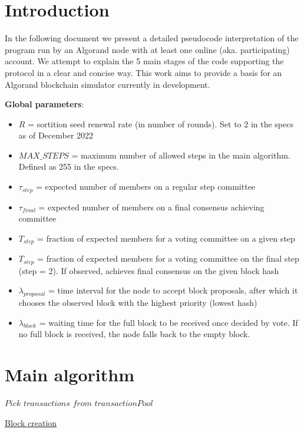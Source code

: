 \documentclass[10pt,a4paper]{article}
\begin{document}
\section{Introduction}
In the following document we present a detailed pseudocode interpretation 
of the program run by an Algorand node with at least one online (aka. 
participating)
account. We attempt to explain the 5 main stages of the code supporting 
the protocol in a clear and concise way.
This work aims to provide a basis for an Algorand blockchain simulator 
currently in development. \newline

\noindent \textbf{Global parameters}:
\begin{itemize}
    \item $R$ = sortition seed renewal rate (in number of rounds). Set to 2 in the specs
    as of December 2022
    \item $MAX\_STEPS$ = maximum number of allowed steps in the main algorithm. Defined 
    as 255 in the specs.
    \item $\tau_{step}$ = expected number of members on a regular step committee
    \item $\tau_{final}$ = expected number of members on a final consensus achieving committee
    \item $T_{step}$ = fraction of expected members for a voting committee on a given step
    \item $T_{step}$ = fraction of expected members for a voting committee on the final step (step = 2). If observed,
    achieves final consensus on the given block hash
    \item $\lambda_{proposal}$ = time interval for the node to accept block proposals, after
    which it chooses the observed block with the highest priority (lowest hash) 
    \item $\lambda_{block}$ = waiting time for the full block to be received once decided by vote.
    If no full block is received, the node falls back to the empty block.
  \end{itemize}


\section{Main algorithm}

\begin{algorithm}
    \begin{algorithmic}[H]
    
    \State $Pick$ $transactions$ $from$ $transactionPool$
    
    \EndFunction
    \end{algorithmic}
    \caption{\underline{Block creation}}
    \label{alg:fuerza_bruta}
\end{algorithm}
\end{document}
